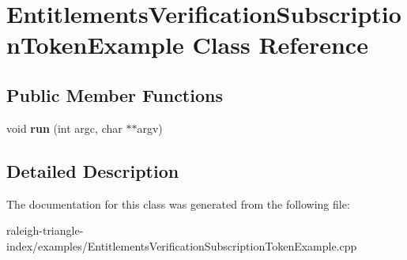 \section{Entitlements\+Verification\+Subscription\+Token\+Example Class Reference}
\label{class_entitlements_verification_subscription_token_example}
\subsection*{Public Member Functions}
\begin{DoxyCompactItemize}
\item 
void {\bfseries run} (int argc, char $\ast$$\ast$argv)\label{class_entitlements_verification_subscription_token_example_a312754b788d1b3c8abd5661f0ab8cf86}

\end{DoxyCompactItemize}


\subsection{Detailed Description}


The documentation for this class was generated from the following file\+:\begin{DoxyCompactItemize}
\item 
raleigh-\/triangle-\/index/examples/Entitlements\+Verification\+Subscription\+Token\+Example.\+cpp\end{DoxyCompactItemize}

